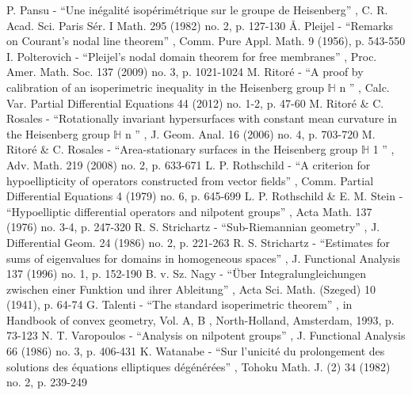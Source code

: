  P. Pansu - “Une inégalité isopérimétrique sur le groupe de Heisenberg” , C. R. Acad. Sci. Paris Sér. I Math. 295 (1982) no. 2, p. 127-130
 Å. Pleijel - “Remarks on Courant’s nodal line theorem” , Comm. Pure Appl. Math. 9 (1956), p. 543-550
 I. Polterovich - “Pleijel’s nodal domain theorem for free membranes” , Proc. Amer. Math. Soc. 137 (2009) no. 3, p. 1021-1024
 M. Ritoré - “A proof by calibration of an isoperimetric inequality in the Heisenberg group $\mathbb{H}$ n ” , Calc. Var. Partial Differential Equations 44 (2012) no. 1-2, p. 47-60
 M. Ritoré \& C. Rosales - “Rotationally invariant hypersurfaces with constant mean curvature in the Heisenberg group $\mathbb{H}$ n ” , J. Geom. Anal. 16 (2006) no. 4, p. 703-720
 M. Ritoré \& C. Rosales - “Area-stationary surfaces in the Heisenberg group $\mathbb{H}$ 1 ” , Adv. Math. 219 (2008) no. 2, p. 633-671
 L. P. Rothschild - “A criterion for hypoellipticity of operators constructed from vector fields” , Comm. Partial Differential Equations 4 (1979) no. 6, p. 645-699
 L. P. Rothschild \& E. M. Stein - “Hypoelliptic differential operators and nilpotent groups” , Acta Math. 137 (1976) no. 3-4, p. 247-320
 R. S. Strichartz - “Sub-Riemannian geometry” , J. Differential Geom. 24 (1986) no. 2, p. 221-263
 R. S. Strichartz - “Estimates for sums of eigenvalues for domains in homogeneous spaces” , J. Functional Analysis 137 (1996) no. 1, p. 152-190
 B. v. Sz. Nagy - “Über Integralungleichungen zwischen einer Funktion und ihrer Ableitung” , Acta Sci. Math. (Szeged) 10 (1941), p. 64-74
 G. Talenti - “The standard isoperimetric theorem” , in Handbook of convex geometry, Vol. A, B , North-Holland, Amsterdam, 1993, p. 73-123
 N. T. Varopoulos - “Analysis on nilpotent groups” , J. Functional Analysis 66 (1986) no. 3, p. 406-431
 K. Watanabe - “Sur l’unicité du prolongement des solutions des équations elliptiques dégénérées” , Tohoku Math. J. (2) 34 (1982) no. 2, p. 239-249

